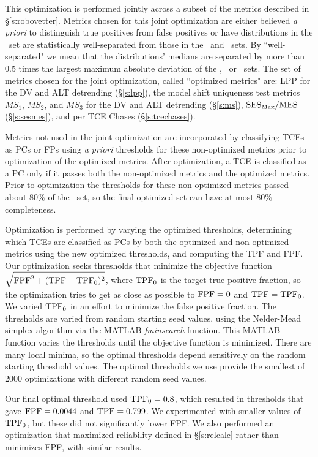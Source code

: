 This optimization is performed jointly across a subset of the metrics described in \S\ref{s:robovetter}.  Metrics chosen for this joint optimization are either believed {\it a priori} to distinguish true positives from false positives or have distributions in the \injtce\ set are statistically well-separated from those in the \scrtce\ and \invtce\ sets.  By ``well-separated" we mean that the distributions' medians are separated by more than 0.5 times the largest maximum absolute deviation of the \injtce, \scrtce\ or \invtce\ sets.  The set of metrics chosen for the joint optimization, called ``optimized metrics" are: LPP for the DV and ALT detrending (\S\ref{s:lpp}), the model shift uniqueness test metrics $MS_{1}$, $MS_{2}$, and $MS_{3}$ for the DV and ALT detrending (\S\ref{s:ms}), ${{\rm SES}_{\rm Max} / {\rm MES}}$ (\S\ref{s:sesmes}), and per TCE Chases (\S\ref{s:tcechases}). 

Metrics not used in the joint optimization are incorporated by classifying TCEs as PCs or FPs using {\it a priori} thresholds for these non-optimized metrics prior to optimization of the optimized metrics.  After optimization, a TCE is classified as a PC only if it passes both the non-optimized metrics and the optimized metrics.  Prior to optimization the thresholds for these non-optimized metrics passed about 80\% of the  \injtce\ set, so the final optimized set can have at most 80\% completeness.  

Optimization is performed by varying the optimized thresholds, determining which TCEs are classified as PCs by both the optimized and non-optimized metrics using the new optimized thresholds, and computing the TPF and FPF.  Our optimization seeks thresholds that minimize the objective function $\sqrt{{\rm FPF}^2 + ({\rm TPF} - {\rm TPF}_0)^2}$, where ${\rm TPF}_0$ is the target true positive fraction, so the optimization tries to get as close as possible to ${\rm FPF} = 0$ and ${\rm TPF} = {\rm TPF}_0$.  We varied ${\rm TPF}_0$ in an effort to minimize the false positive fraction. The thresholds are varied from random starting seed values, using the Nelder-Mead simplex algorithm via the \textsc{MATLAB} {\it fminsearch} function.  This \textsc{MATLAB} function varies the thresholds until the objective function is minimized.  There are many local minima, so the optimal thresholds depend sensitively on the random starting threshold values.  The optimal thresholds we use provide the smallest of 2000 optimizations with different random seed values.

Our final optimal threshold used ${\rm TPF}_0 = 0.8$, which resulted in thresholds that gave ${\rm FPF} = 0.0044$ and ${\rm TPF} = 0.799$.  We experimented with smaller values of ${\rm TPF}_0$, but these did not significantly lower FPF.   We also performed an optimization that maximized reliability defined in \S\ref{s:relcalc} rather than minimizes FPF, with similar results.  

